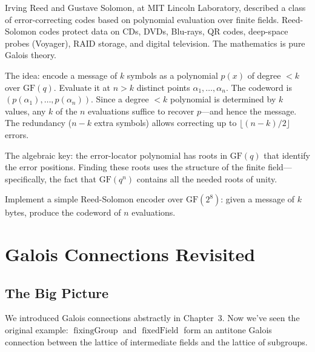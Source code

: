 \documentclass[11pt, a4paper, oneside]{book}
\newcommand{\GF}{\mathrm{GF}}
\newcommand{\fixgrp}{\operatorname{fixingGroup}}
\newcommand{\fixfld}{\operatorname{fixedField}}
\newcounter{exercise}[chapter]
\begin{document}
\begin{historical}[title={Reed and Solomon (1960)}]
Irving Reed and Gustave Solomon, at MIT Lincoln Laboratory, described a
class of error-correcting codes based on polynomial evaluation over finite
fields. Reed-Solomon codes protect data on CDs, DVDs, Blu-rays, QR codes,
deep-space probes (Voyager), RAID storage, and digital television. The
mathematics is pure Galois theory.
\end{historical}

The idea: encode a message of $k$ symbols as a polynomial $p(x)$ of degree
$< k$ over $\GF(q)$. Evaluate it at $n > k$ distinct points
$\alpha_1, \ldots, \alpha_n$. The codeword is
$(p(\alpha_1), \ldots, p(\alpha_n))$. Since a degree $< k$ polynomial is
determined by $k$ values, any $k$ of the $n$ evaluations suffice to recover
$p$---and hence the message. The redundancy ($n - k$ extra symbols) allows
correcting up to $\lfloor(n-k)/2\rfloor$ errors.

The algebraic key: the error-locator polynomial has roots in $\GF(q)$ that
identify the error positions. Finding these roots uses the structure of the
finite field---specifically, the fact that $\GF(q^n)$ contains all the
needed roots of unity.

\begin{exercisebox}[title={Exercise 14.1}]
Implement a simple Reed-Solomon encoder over $\GF(2^8)$: given a message of
$k$ bytes, produce the codeword of $n$ evaluations.
\end{exercisebox}

\chapter{Galois Connections Revisited}

\section{The Big Picture}

We introduced Galois connections abstractly in Chapter~3. Now we've seen the
original example: $\fixgrp$ and $\fixfld$ form an antitone Galois connection
between the lattice of intermediate fields and the lattice of subgroups.
\end{document}
